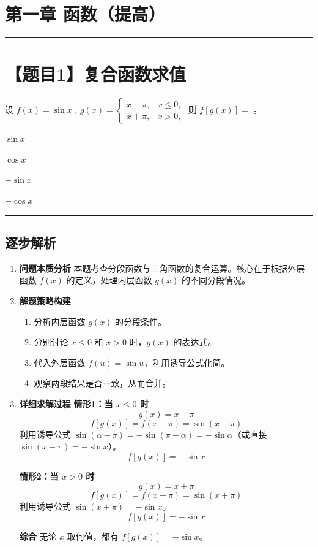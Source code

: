 \documentclass[UTF8]{ctexart}
\newenvironment{redenv}{\color{red}}{}
\newenvironment{detailedanalysis}{%
    \color{red}
    \begin{enumerate}[label=\textbf{第\arabic*步：}, leftmargin=*, align=left, itemsep=1.5ex]
}{%
    \end{enumerate}
}
\newcommand{\problemrule}{\noindent\rule{\textwidth}{1.5pt}\vspace{-0.8em}}
\newcommand{\analysisrule}{\noindent\rule{\textwidth}{0.8pt}\vspace{-0.8em}}
\newcommand{\choicesFour}[4]{
    \begin{enumerate}[label=\Alph*., itemsep=0pt, parsep=0pt, topsep=5pt, labelsep=0.5em]
        \begin{minipage}{0.22\linewidth} \item #1 \end{minipage}
        \begin{minipage}{0.22\linewidth} \item #2 \end{minipage}
        \begin{minipage}{0.22\linewidth} \item #3 \end{minipage}
        \begin{minipage}{0.22\linewidth} \item #4 \end{minipage}
    \end{enumerate}
}
\newcommand{\blank}[1]{\underline{\hspace{#1}}}
\begin{document}
\section*{第一章 函数（提高）}

\problemrule
\section*{【题目1】复合函数求值}
设 $ f(x)=\sin x $ , $ g(x)=\begin{cases}x-\pi, & x\leq0,\\x+\pi, & x>0,\end{cases} $ 则 $ f[g(x)]= $ \blank{1cm}。
\choicesFour{$ \sin x $}{$ \cos x $}{$ - \sin x $}{$ - \cos x $}

\begin{redenv}
\analysisrule
\subsection*{逐步解析}

\begin{detailedanalysis}
\item \textbf{问题本质分析}
本题考查分段函数与三角函数的复合运算。核心在于根据外层函数 $f(x)$ 的定义，处理内层函数 $g(x)$ 的不同分段情况。

\item \textbf{解题策略构建}
\begin{enumerate}[label=(\alph*)]
\item 分析内层函数 $g(x)$ 的分段条件。
\item 分别讨论 $x \le 0$ 和 $x > 0$ 时，$g(x)$ 的表达式。
\item 代入外层函数 $f(u) = \sin u$，利用诱导公式化简。
\item 观察两段结果是否一致，从而合并。
\end{enumerate}

\item \textbf{详细求解过程}
\textbf{情形1：当 $x \le 0$ 时}
$$ g(x) = x - \pi $$
$$ f[g(x)] = f(x - \pi) = \sin(x - \pi) $$
利用诱导公式 $\sin(\alpha - \pi) = -\sin(\pi - \alpha) = -\sin \alpha$（或直接 $\sin(x-\pi) = -\sin x$）。
$$ f[g(x)] = -\sin x $$

\textbf{情形2：当 $x > 0$ 时}
$$ g(x) = x + \pi $$
$$ f[g(x)] = f(x + \pi) = \sin(x + \pi) $$
利用诱导公式 $\sin(x + \pi) = -\sin x$。
$$ f[g(x)] = -\sin x $$

\textbf{综合}
无论 $x$ 取何值，都有 $f[g(x)] = -\sin x$。


\end{detailedanalysis}
\end{redenv}
\end{document}
